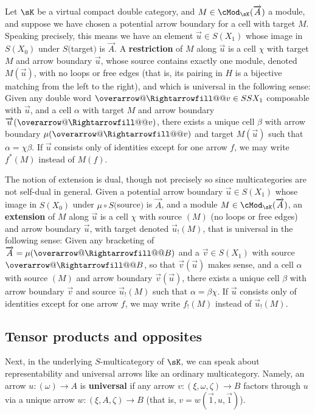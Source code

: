 \documentclass{amsart}
\makeatletter
\newcommand\reldoublebar{\mathrel{\smash=}}
\newcommand{\Rightarrowfill@@}[1]{%
\m@th \setboxz@h {$#1\reldoublebar $}\ht \z@ \z@ 
$#1\copy \z@ 
\mkern -6mu\cleaders \hbox {$#1\mkern -2mu\box \z@ \mkern -2mu$}\hfill 
\mkern -6mu
\mathord \Rightarrow $}
\newcommand{\Overrightarrow}{\mathpalette{\overarrow@\Rightarrowfill@@}}
\newcommand{\K}{\sK}
\def\cart{\chi}
\def\opcart{\chi}
\let\vec\overrightarrow
\let\Vec\Overrightarrow
\makeatother
\begin{document}
Let $\K$ be a virtual compact double category, and $M\in\cMod_\K(\vec{A})$ a module, and suppose we have chosen a potential arrow boundary for a cell with target $M$.
Speaking precisely, this means we have an element $\vec{u}\in S(X_1)$ whose image in $S(X_0)$ under $S($target$)$ is $\vec A$.
A \textbf{restriction} of $M$ along $\vec{u}$ is a cell $\cart$ with target $M$ and arrow boundary $\vec{u}$, whose source contains exactly one module, denoted $M(\vec{u})$, with no loops or free edges (that is, its pairing in $H$ is a bijective matching from the left to the right), and which is universal in the following sense:
Given any double word $\Vec v \in SSX_1$ composable with $\vec u$, and a cell $\alpha$ with target $M$ and arrow boundary $\vec u(\Vec v)$, there exists a unique cell $\beta$ with arrow boundary $\mu(\Vec v)$ and target $M(\vec{u})$ such that $\alpha = \cart\beta$.
If $\vec{u}$ consists only of identities except for one arrow $f$, we may write $f^*(M)$ instead of $M(f)$.

The notion of extension is dual, though not precisely so since multicategories are not self-dual in general.
Given a potential arrow boundary $\vec{u}\in S(X_1)$ whose image in $S(X_0)$ under $\mu \circ S($source$)$ is $\vec A$, and a module $M\in \cMod_\K(\vec A)$, an \textbf{extension} of $M$ along $\vec{u}$ is a cell $\opcart$ with source $(M)$ (no loops or free edges) and arrow boundary $\vec{u}$, with target denoted $\vec{u}_!(M)$, that is universal in the following sense:
Given any bracketing of $\vec{A} = \mu(\Vec{B})$ and a $\vec{v} \in S(X_1)$ with source $\Vec{B}$, so that $\vec{v}(\vec u)$ makes sense, and a cell $\alpha$ with source $(M)$ and arrow boundary $\vec{v}(\vec u)$, there exists a unique cell $\beta$ with arrow boundary $\vec{v}$ and source $\vec{u}_!(M)$ such that $\alpha = \beta\opcart$.
If $\vec{u}$ consists only of identities except for one arrow $f$, we may write $f_!(M)$ instead of $\vec{u}_!(M)$.

\subsection{Tensor products and opposites}
\label{sec:tensors}

Next, in the underlying $S$-multicategory of $\K$, we can speak about representability and universal arrows like an ordinary multicategory.
Namely, an arrow $u:(\omega) \to A$ is \textbf{universal} if any arrow $v:(\xi,\omega,\zeta) \to B$ factors through $u$ via a unique arrow $w:(\xi,A,\zeta) \to B$ (that is, $v = w(\vec 1,u,\vec 1)$).
\end{document}
